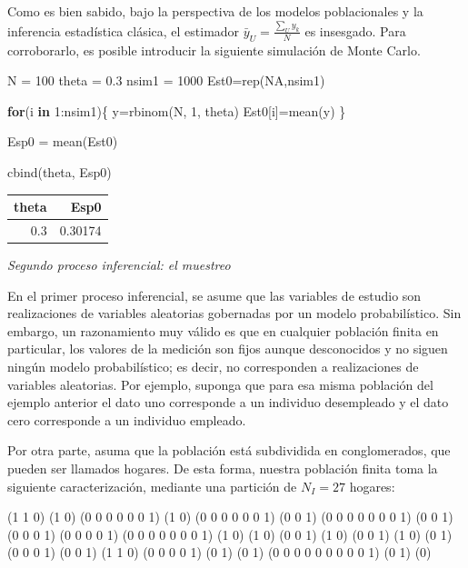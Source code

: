 \documentclass[
  12pt,
]{book}
\newenvironment{Shaded}{\begin{snugshade}}{\end{snugshade}}
\newcommand{\ConstantTok}[1]{\textcolor[rgb]{0.00,0.00,0.00}{#1}}
\newcommand{\ControlFlowTok}[1]{\textcolor[rgb]{0.13,0.29,0.53}{\textbf{#1}}}
\newcommand{\DecValTok}[1]{\textcolor[rgb]{0.00,0.00,0.81}{#1}}
\newcommand{\FloatTok}[1]{\textcolor[rgb]{0.00,0.00,0.81}{#1}}
\newcommand{\FunctionTok}[1]{\textcolor[rgb]{0.00,0.00,0.00}{#1}}
\newcommand{\NormalTok}[1]{#1}
\newcommand{\OtherTok}[1]{\textcolor[rgb]{0.56,0.35,0.01}{#1}}
\newcommand{\SpecialCharTok}[1]{\textcolor[rgb]{0.00,0.00,0.00}{#1}}
\begin{document}
Como es bien sabido, bajo la perspectiva de los modelos poblacionales y la inferencia estadística clásica, el estimador \(\bar{y}_U = \frac{\sum_U y_k}{N}\) es insesgado. Para corroborarlo, es posible introducir la siguiente simulación de Monte Carlo.

\begin{Shaded}
\begin{Highlighting}[]
\NormalTok{N }\OtherTok{=} \DecValTok{100}
\NormalTok{theta }\OtherTok{=} \FloatTok{0.3}
\NormalTok{nsim1 }\OtherTok{=} \DecValTok{1000}
\NormalTok{Est0}\OtherTok{=}\FunctionTok{rep}\NormalTok{(}\ConstantTok{NA}\NormalTok{,nsim1)}

\ControlFlowTok{for}\NormalTok{(i }\ControlFlowTok{in} \DecValTok{1}\SpecialCharTok{:}\NormalTok{nsim1)\{}
\NormalTok{y}\OtherTok{=}\FunctionTok{rbinom}\NormalTok{(N, }\DecValTok{1}\NormalTok{, theta)}
\NormalTok{Est0[i]}\OtherTok{=}\FunctionTok{mean}\NormalTok{(y)}
\NormalTok{\}}

\NormalTok{Esp0 }\OtherTok{=} \FunctionTok{mean}\NormalTok{(Est0)}

\FunctionTok{cbind}\NormalTok{(theta, Esp0)  }
\end{Highlighting}
\end{Shaded}

\begin{tabular}{r|r}
\hline
theta & Esp0\\
\hline
0.3 & 0.30174\\
\hline
\end{tabular}

\emph{Segundo proceso inferencial: el muestreo}

En el primer proceso inferencial, se asume que las variables de estudio son realizaciones de variables aleatorias gobernadas por un modelo probabilístico. Sin embargo, un razonamiento muy válido es que en cualquier población finita en particular, los valores de la medición son fijos aunque desconocidos y no siguen ningún modelo probabilístico;
es decir, no corresponden a realizaciones de variables aleatorias. Por ejemplo, suponga que para esa misma población del ejemplo anterior el dato uno corresponde a un individuo desempleado y el dato cero corresponde a un individuo empleado.

Por otra parte, asuma que la población está subdividida en conglomerados, que pueden ser llamados hogares. De esta forma, nuestra población finita toma la siguiente caracterización, mediante una partición de \(N_{I}=27\) hogares:

(1 1 0) (1 0) (0 0 0 0 0 0 1) (1 0) (0 0 0 0 0 0 1) (0 0
1) (0 0 0 0 0 0 0 1) (0 0 1) (0 0 0 1) (0 0 0 0 1) (0 0
0 0 0 0 0 1) (1 0) (1 0) (0 0 1) (1 0) (0 0 1) (1 0) (0 1)
(0 0 0 1) (0 0 1) (1 1 0) (0 0 0 0 1) (0 1) (0 1) (0 0 0 0
0 0 0 0 0 1) (0 1) (0)
\end{document}
